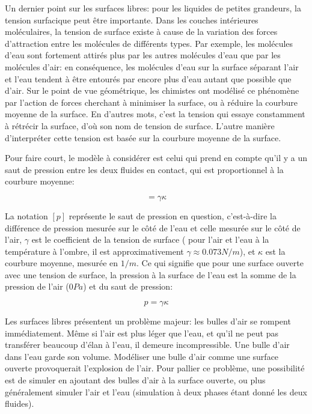\documentclass[11pt]{report}
\begin{document}
Un dernier point sur les surfaces libres: pour les liquides de petites grandeurs, la tension surfacique peut être importante. Dans les couches intérieures moléculaires, la tension de surface existe à cause de la variation des forces d'attraction entre les molécules de différents types. Par exemple, les molécules d'eau sont fortement attirés  plus par les autres molécules d'eau que par les molécules d'air: en conséquence, les molécules d'eau sur la surface séparant l'air et l'eau tendent à être entourés par encore plus d'eau autant que possible que d'air. Sur le point de vue géométrique, les chimistes ont modélisé ce phénomène par l'action de forces cherchant à minimiser la surface, ou à réduire la courbure moyenne de la surface. En d'autres mots, c'est la tension qui essaye constamment à rétrécir la surface, d'où son nom de tension de surface. L'autre manière d'interpréter cette tension est basée sur la courbure moyenne de la surface.\newline

Pour faire court, le modèle à considérer est celui qui prend en compte qu'il y a un saut de pression entre les deux fluides en contact, qui est proportionnel à la courbure moyenne:

\begin{equation}
[p] = \gamma \kappa
\end{equation}

La notation $ [p] $ représente le saut de pression en question, c'est-à-dire la différence de pression mesurée sur le côté de l'eau et celle mesurée sur le côté de l'air, $ \gamma $ est le coefficient de la tension de surface ( pour l'air et l'eau à la température à l'ombre, il est approximativement $ \gamma \approx 0.073 N/m $), et $ \kappa $ est la courbure moyenne, mesurée en $ 1/m $. Ce qui signifie que pour une surface ouverte avec une tension de surface, la pression à la surface de l'eau est la somme  de la pression de l'air ($0 Pa$) et du saut de pression:

\begin{equation}
p = \gamma \kappa
\end{equation}

Les surfaces libres présentent un problème majeur: les bulles d'air se rompent immédiatement. Même si l'air est plus léger que l'eau, et qu'il ne peut pas transférer beaucoup d'élan à l'eau, il demeure incompressible. Une bulle d'air dans l'eau garde son volume. Modéliser une bulle d'air comme une surface ouverte provoquerait l'explosion de l'air. Pour pallier ce problème, une possibilité est de simuler en ajoutant des bulles d'air à la surface ouverte, ou plus généralement simuler l'air et l'eau (simulation à deux phases étant donné les deux fluides).
\end{document}
